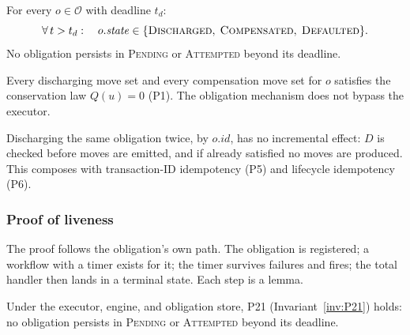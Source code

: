 \begin{invariant}
\label{inv:P21}\label{inv:obligation-liveness}
For every $o \in \mathcal{O}$ with deadline $t_d$:
\[
\forall\, t > t_d : \quad o.\mathit{state} \in \{\textsc{Discharged},\; \textsc{Compensated},\; \textsc{Defaulted}\}.
\]
No obligation persists in \textsc{Pending} or \textsc{Attempted} beyond its deadline.
\end{invariant}

\begin{invariant}
\label{inv:P22}\label{inv:obligation-conservation}
Every discharging move set and every compensation move set for $o$ satisfies the conservation law $Q(u) = 0$ (P1). The obligation mechanism does not bypass the executor.
\end{invariant}

\begin{invariant}
\label{inv:P23}\label{inv:obligation-idempotency}
Discharging the same obligation twice, by $o.\mathit{id}$, has no incremental effect: $D$ is checked before moves are emitted, and if already satisfied no moves are produced. This composes with transaction-ID idempotency (P5) and lifecycle idempotency (P6).
\end{invariant}

\subsubsection{Proof of liveness}
\label{sec:liveness-proof}

The proof follows the obligation's own path. The obligation is registered; a workflow with a timer exists for it; the timer survives failures and fires; the total handler then lands in a terminal state. Each step is a lemma.

\begin{theorem}
\label{thm:obligation-liveness}
Under the executor, engine, and obligation store, P21 (Invariant~\ref{inv:P21}) holds: no obligation persists in \textsc{Pending} or \textsc{Attempted} beyond its deadline.
\end{theorem}

